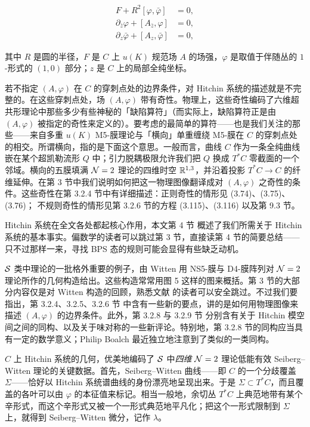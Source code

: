 \begin{align}
F + R^2 [\varphi , \bar\varphi] & = 0, \label{eq:hitchin-1}\\
\partial_{\bar z} \varphi  + [ A_{\bar z}  ,\varphi] & = 0, \label{eq:hitchin-2}\\
\partial_z \bar\varphi  + [ A_z,\bar\varphi]  & = 0, \label{eq:hitchin-3}
\end{align}

其中 $R$ 是圆的半径，$F$ 是 $C$ 上 $u(K)$ 规范场 $A$ 的场强，$\varphi$ 是取值于伴随丛的 $1$-形式的 $(1,0)$ 部分；$z$ 是 $C$ 上的局部全纯坐标。

若不指定 $(A,\varphi)$ 在 $C$ 的穿刺点处的边界条件，对 Hitchin 系统的描述就是不完整的。在这些穿刺点处，场 $(A,\varphi)$ 带有奇性。物理上，这些奇性编码了六维超共形理论中那些多少有些神秘的「缺陷算符」（而实际上，缺陷算符正是由 $(A,\varphi)$ 被指定的奇性来定义的）。要考虑的最简单的算符——也是我们关注的那些——来自多重 $u(K)$ M5-膜理论与「横向」单重缠绕 M5-膜在 $C$ 的穿刺点处的相交。所谓横向，指的是下面这个意思。一般而言，曲线 $C$ 作为一条全纯曲线嵌在某个超凯勒流形 $Q$ 中；引力脱耦极限允许我们把 $Q$ 换成 $T^*C$ 零截面的一个邻域。横向的五膜填满 $\mathcal{N}=2$ 理论的四维时空 $\mathbb{R}^{1,3}$，并沿着投影 $T^*C \to C$ 的纤维延伸。在第 3 节中我们说明如何把这一物理图像翻译成对 $(A,\varphi)$ 之奇性的条件。这些奇性在第 3.2.4 节中有详细描述：正则奇性的情形见 (3.74)、(3.75)、(3.76)；%
不规则奇性的情形见第 3.2.6 节的方程 (3.115)、(3.116) 以及第 9.3 节。

Hitchin 系统在全文各处都起核心作用，本文第 4 节%
概述了我们所需关于 Hitchin 系统的基本事实。偏数学的读者可以跳过第 3 节，直接读第 4 节的简要总结——只不过那样一来，寻找 BPS 态的规则可能会显得有些缺乏动机。

$\mathcal{S}$ 类中理论的一批格外重要的例子，由 Witten 用 NS5-膜与 D4-膜阵列对 $\mathcal{N}=2$ 理论所作的几何构造给出\cite{Witten:1997sc}。这些构造常常用图 5%
这样的图来概括。第 3 节的大部分内容仅是对 Witten 构造的回顾，熟悉文献 \cite{Klemm:1996bj,Witten:1997sc} 的读者可以安全跳过。不过我们要指出，第 3.2.4、3.2.5、3.2.6 节%
中含有一些新的要点，讲的是如何用物理图像来描述 $(A,\varphi)$ 的边界条件。此外，第 3.2.8 与 3.2.9 节%
分别含有关于 Hitchin 模空间之间的同构、以及关于味对称的一些新评论。特别地，第 3.2.8 节的同构应当具有一定的数学意义；Philip Boalch 最近独立地注意到了类似的一类同构\cite{irkm}。

$C$ 上 Hitchin 系统的几何，优美地编码了 $\mathcal{S}$ 中\emph{四维} $\mathcal{N}=2$ 理论低能有效 Seiberg–Witten 理论的关键数据。首先，Seiberg–Witten 曲线——即 $C$ 的一个分歧覆盖 $\Sigma$——恰好以 Hitchin 系统谱曲线的身份漂亮地呈现出来。于是 $\Sigma \subset T^*C$，而且覆盖的各叶可以由 $\varphi$ 的本征值来标记。相当一般地，余切丛 $T^*C$ 上典范地带有某个辛形式，而这个辛形式又被一个一形式典范地平凡化；把这个一形式限制到 $\Sigma$ 上，就得到 Seiberg–Witten 微分，记作 $\lambda$。

